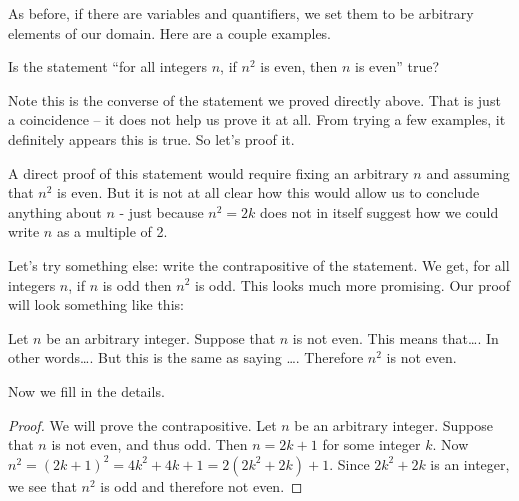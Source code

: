 \documentclass[12pt]{article}
\begin{document}
As before, if there are variables and quantifiers, we set them to be arbitrary elements of our domain.  Here are a couple examples.
 
 \begin{example}
   Is the statement ``for all integers $n$, if $n^2$ is even, then $n$ is even'' true?  
   \begin{solution}
     Note this is the converse of the statement we proved directly above.  That is just a coincidence -- it does not help us prove it at all.  From trying a few examples, it definitely appears this is true.  So let's proof it.
     
     A direct proof of this statement would require fixing an arbitrary $n$ and assuming that $n^2$ is even.  But it is not at all clear how this would allow us to conclude anything about $n$ - just because $n^2 = 2k$ does not in itself suggest how we could write $n$ as a multiple of 2.  
     
     Let's try something else: write the contrapositive of the statement.  We get, for all integers $n$, if $n$ is odd then $n^2$ is odd.  This looks much more promising.  Our proof will look something like this:
     
     Let $n$ be an arbitrary integer.  Suppose that $n$ is not even.  This means that\ldots.  In other words\ldots.  But this is the same as saying \ldots.  Therefore $n^2$ is not even.
     
     Now we fill in the details.
     \begin{proof}
       We will prove the contrapositive.  Let $n$ be an arbitrary integer.  Suppose that $n$ is not even, and thus odd.  Then $n= 2k+1$ for some integer $k$.  Now $n^2 = (2k+1)^2 = 4k^2 + 4k + 1 = 2(2k^2 + 2k) + 1$.  Since $2k^2 + 2k$ is an integer, we see that $n^2$ is odd and therefore not even.
     \end{proof}
   \end{solution}
 \end{example}
   
\end{document}
